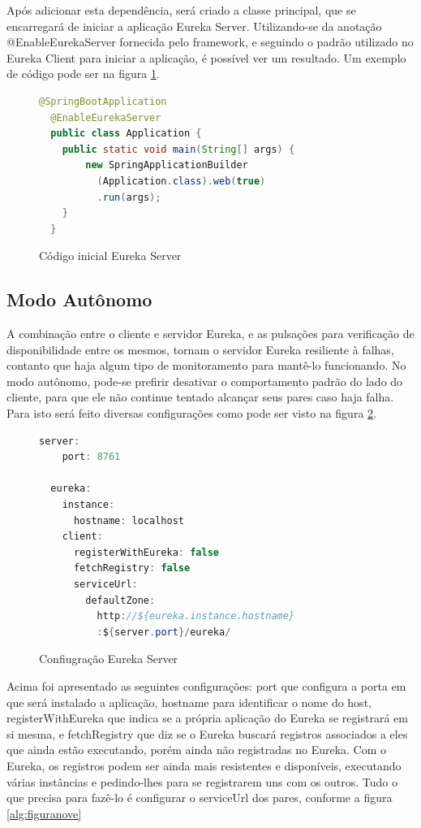 \documentclass[journal]{IEEEtran}
\begin{document}
Após adicionar esta dependência, será criado a classe principal, que se encarregará de iniciar a aplicação Eureka Server. Utilizando-se da anotação @EnableEurekaServer fornecida pelo framework, e seguindo o padrão utilizado no Eureka Client para iniciar a aplicação, é possível ver um resultado. Um exemplo de código pode ser na figura \ref{alg:figurasete}.

\begin{figure}[h]
\centering

\begin{lstlisting}[language=Java]
  @SpringBootApplication
  @EnableEurekaServer
  public class Application {
    public static void main(String[] args) {
        new SpringApplicationBuilder
          (Application.class).web(true)
          .run(args);
    }
  }
\end{lstlisting}

\caption{Código inicial Eureka Server}
\label{alg:figurasete}
\end{figure}

\subsection{Modo Autônomo}

A combinação entre o cliente e servidor Eureka, e as pulsações para verificação de disponibilidade entre os mesmos, tornam o servidor Eureka resiliente à falhas, contanto que haja algum tipo de monitoramento para mantê-lo funcionando. No modo autônomo, pode-se prefirir desativar o comportamento padrão do lado do cliente, para que ele não continue tentado alcançar seus pares caso haja falha. Para isto será feito diversas configurações como pode ser visto na figura \ref{alg:figuraoito}.

\begin{figure}[h]
\centering

\begin{lstlisting}[language=Java]
  server:
    port: 8761

  eureka:
    instance:
      hostname: localhost
    client:
      registerWithEureka: false
      fetchRegistry: false
      serviceUrl:
        defaultZone: 
          http://${eureka.instance.hostname}
          :${server.port}/eureka/
\end{lstlisting}

\caption{Confiugração Eureka Server}
\label{alg:figuraoito}
\end{figure}

Acima foi apresentado as seguintes configurações: port que configura a porta em que será instalado a aplicação, hostname para identificar o nome do host, registerWithEureka que indica se a própria aplicação do Eureka se registrará em si mesma, e fetchRegistry que diz se o Eureka buscará registros associados a eles que ainda estão executando, porém ainda não registradas no Eureka.
Com o Eureka, os registros podem ser ainda mais resistentes e disponíveis, executando várias instâncias e pedindo-lhes para se registrarem uns com os outros. Tudo o que precisa para fazê-lo é configurar o serviceUrl dos pares, conforme a figura \ref{alg:figuranove}
\end{document}
